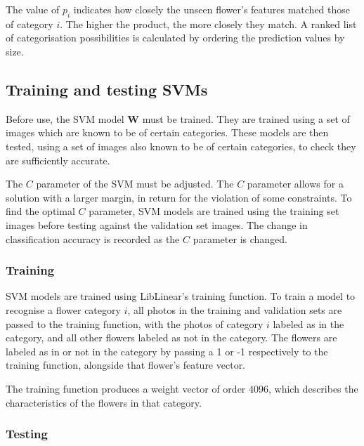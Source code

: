 \documentclass[11pt, a4paper]{report}
\newcommand{\vect}[1]{\boldsymbol{#1}}
\begin{document}
The value of $p_{i}$ indicates how closely the unseen flower's features matched those of category $i$. The higher the product, the more closely they match. A ranked list of categorisation possibilities is calculated by ordering the prediction values by size. 




\subsection{Training and testing SVMs}

Before use, the SVM model $\vect{W}$ must be trained. They are trained using a set of images which are known to be of certain categories. These models are then tested, using a set of images also known to be of certain categories, to check they are sufficiently accurate. 

The $C$ parameter of the SVM must be adjusted. The $C$ parameter allows for a solution with a larger margin, in return for the violation of some constraints. To find the optimal $C$ parameter, SVM models are trained using the training set images  before testing against the validation set images. The change in classification accuracy is recorded as the $C$ parameter is changed. 




\subsubsection{Training} 

SVM models are trained using LibLinear's training function. To train a model to recognise a flower category $i$, all photos in the training and validation sets are passed to the training function, with the photos of category $i$ labeled as in the category, and all other flowers labeled as not in the category. The flowers are labeled as in or not in the category by passing a 1 or -1 respectively to the training function, alongside that flower's feature vector.

The training function produces a weight vector of order 4096, which describes the characteristics of the flowers in that category. 

\subsubsection{Testing}
\end{document}
